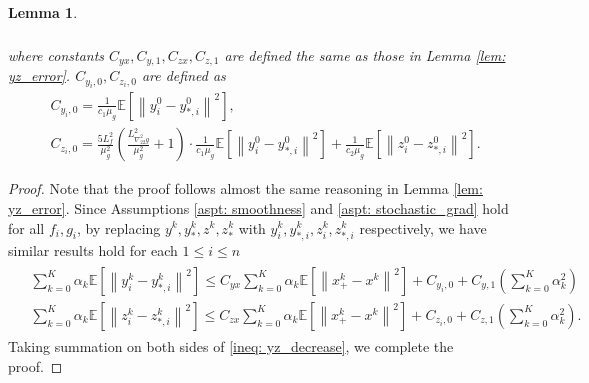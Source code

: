 \documentclass[10pt]{article}
\newtheorem{lemma}{Lemma}[section]
\theoremstyle{remark}
\newcommand{\E}{\mathbb{E}}
\newcommand{\norm}[1]{\left\|#1\right\|}
\begin{document}
\begin{lemma}
\begin{align}
\begin{aligned}
        \end{aligned}
    \end{align}
    where constants $C_{yx}, C_{y,1}, C_{zx}, C_{z,1}$ are defined the same as those in Lemma \ref{lem: yz_error}. $C_{y_i, 0}, C_{z_i, 0}$ are defined as
    \begin{align*}
        &C_{y_i, 0} = \frac{1}{c_1\mu_g}\E\left[\norm{y_i^0 - y_{*,i}^0}^2\right],\\
        &C_{z_i,0} = \frac{5L_f^2}{\mu_g^2}\left(\frac{L_{\nabla_{22}^2g}^2}{\mu_g^2} + 1\right)\cdot\frac{1}{c_1\mu_g}\E\left[\norm{y_i^0 - y_{*,i}^0}^2\right] + \frac{1}{c_2\mu_g}\E\left[\norm{z_i^0 - z_{*,i}^0}^2\right].
    \end{align*}
\end{lemma}
\begin{proof}
    Note that the proof follows almost the same reasoning in Lemma \ref{lem: yz_error}. Since Assumptions \ref{aspt: smoothness} and \ref{aspt: stochastic_grad} hold for all $f_i, g_i$, by replacing $y^k, y_*^k, z^k, z_*^k$ with $y_i^k, y_{*,i}^k, z_i^k, z_{*,i}^k$ respectively, we have similar results hold for each $1\leq i\leq n$
   \begin{align}\label{ineq: yz_decrease}
        \begin{aligned}
            &\sum_{k=0}^{K}\alpha_k\E\left[\norm{y_i^k - y_{*,i}^k}^2\right]\leq C_{yx}\sum_{k=0}^{K}\alpha_k \E\left[\norm{x_+^k - x^k}^2\right] + C_{y_i,0} + C_{y,1}\left(\sum_{k=0}^{K}\alpha_k^2\right) \\
        &\sum_{k=0}^{K}\alpha_k\E\left[\norm{z_i^k-z_{*,i}^k}^2\right] \leq C_{zx}\sum_{k=0}^{K}\alpha_k \E\left[\norm{x_+^k - x^k}^2\right] + C_{z_i,0} + C_{z,1}\left(\sum_{k=0}^{K}\alpha_k^2\right).
        \end{aligned}
    \end{align}
    Taking summation on both sides of \eqref{ineq: yz_decrease}, we complete the proof.

\end{proof}
\end{document}
